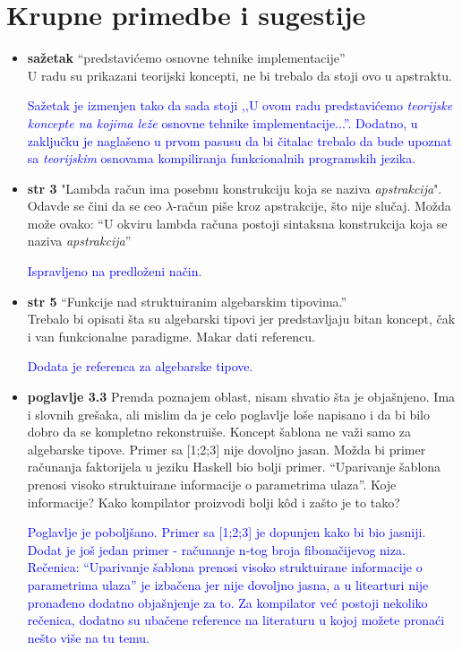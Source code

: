 \documentclass[a4paper]{report}
\newcommand{\odgovor}[1]{\textcolor{blue}{#1}}
\begin{document}
\section{Krupne primedbe i sugestije}
\begin{itemize}
\item \textbf{sažetak} ``predstavićemo osnovne tehnike implementacije'' \\ U radu su prikazani teorijski koncepti, ne bi trebalo da stoji ovo u apstraktu.

\odgovor{Sažetak je izmenjen tako da sada stoji ‚‚U ovom radu predstavićemo \textit{teorijske koncepte na kojima leže} osnovne tehnike implementacije...''. Dodatno, u zaključku je naglašeno u prvom pasusu da bi čitalac trebalo da bude upoznat sa \textit{teorijskim} osnovama kompiliranja funkcionalnih programskih jezika.}

\item \textbf{str 3} "Lambda račun ima posebnu konstrukciju koja se naziva \textit{apstrakcija}".\\Odavde se čini da se ceo $\lambda$-račun piše kroz apstrakcije, što nije slučaj. Možda može ovako: ``U okviru lambda računa postoji sintaksna konstrukcija koja se naziva \textit{apstrakcija}''

\odgovor{Ispravljeno na predloženi način.}

\item \textbf{str 5} ``Funkcije nad struktuiranim algebarskim tipovima.'' \\ Trebalo bi opisati šta su algebarski tipovi jer predstavljaju bitan koncept, čak i van funkcionalne paradigme. Makar dati referencu.

\odgovor{Dodata je referenca za algebarske tipove.}

\item \textbf{poglavlje 3.3} Premda poznajem oblast, nisam shvatio šta je objašnjeno. Ima i slovnih grešaka, ali mislim da je celo poglavlje loše napisano i da bi bilo dobro da se kompletno rekonstruiše. Koncept šablona ne važi samo za algebarske tipove. Primer sa [1;2;3] nije dovoljno jasan. Možda bi primer računanja faktorijela u jeziku Haskell bio bolji primer. ``Uparivanje šablona prenosi visoko struktuirane informacije o parametrima ulaza''. Koje informacije? Kako kompilator proizvodi bolji kôd i zašto je to tako?

\odgovor{Poglavlje je poboljšano. Primer sa [1;2;3] je dopunjen kako bi bio jasniji. Dodat je još jedan primer - računanje n-tog broja fibonačijevog niza. Rečenica: ``Uparivanje šablona prenosi visoko struktuirane informacije o parametrima ulaza'' je izbačena jer nije dovoljno jasna, a u litearturi nije pronađeno dodatno objašnjenje za to. Za kompilator već postoji nekoliko rečenica, dodatno su ubačene reference na literaturu u kojoj možete pronaći nešto više na tu temu.}


\end{itemize}
\end{document}
